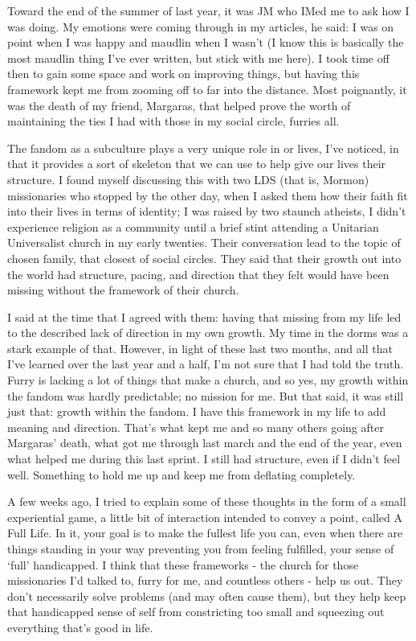 Toward the end of the summer of last year, it was JM who IMed me to ask how I was doing. My emotions were coming through in my articles, he said: I was on point when I was happy and maudlin when I wasn't (I know this is basically the most maudlin thing I've ever written, but stick with me here). I took time off then to gain some space and work on improving things, but having this framework kept me from zooming off to far into the distance. Most poignantly, it was the death of my friend, Margaras, that helped prove the worth of maintaining the ties I had with those in my social circle, furries all.

The fandom as a subculture plays a very unique role in or lives, I've noticed, in that it provides a sort of skeleton that we can use to help give our lives their structure. I found myself discussing this with two LDS (that is, Mormon) missionaries who stopped by the other day, when I asked them how their faith fit into their lives in terms of identity; I was raised by two staunch atheists, I didn't experience religion as a community until a brief stint attending a Unitarian Universalist church in my early twenties. Their conversation lead to the topic of chosen family, that closest of social circles. They said that their growth out into the world had structure, pacing, and direction that they felt would have been missing without the framework of their church.

I said at the time that I agreed with them: having that missing from my life led to the described lack of direction in my own growth. My time in the dorms was a stark example of that. However, in light of these last two months, and all that I've learned over the last year and a half, I'm not sure that I had told the truth. Furry is lacking a lot of things that make a church, and so yes, my growth within the fandom was hardly predictable; no mission for me. But that said, it was still just that: growth within the fandom. I have this framework in my life to add meaning and direction. That's what kept me and so many others going after Margaras' death, what got me through last march and the end of the year, even what helped me during this last sprint. I still had structure, even if I didn't feel well. Something to hold me up and keep me from deflating completely.

A few weeks ago, I tried to explain some of these thoughts in the form of a small experiential game, a little bit of interaction intended to convey a point, called A Full Life. In it, your goal is to make the fullest life you can, even when there are things standing in your way preventing you from feeling fulfilled, your sense of `full' handicapped. I think that these frameworks - the church for those missionaries I'd talked to, furry for me, and countless others - help us out. They don't necessarily solve problems (and may often cause them), but they help keep that handicapped sense of self from constricting too small and squeezing out everything that's good in life.


